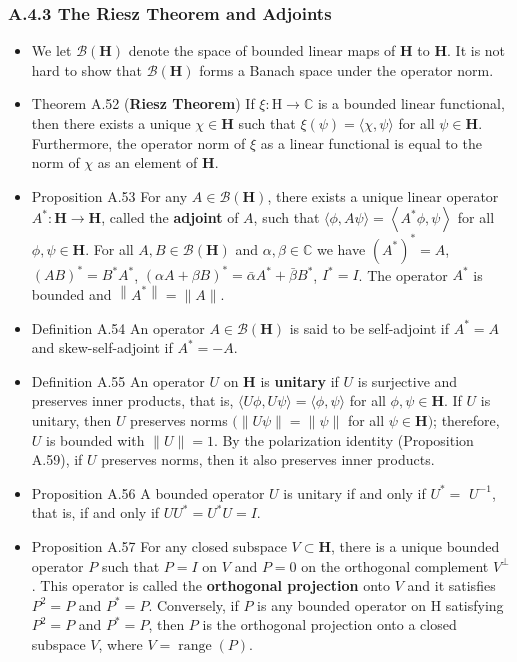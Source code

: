 \subsubsection{A.4.3 The Riesz Theorem and Adjoints}

\begin{itemize}
\item We let $\mathcal{B}(\mathbf{H})$ denote the space of bounded linear maps of $\mathbf{H}$ to $\mathbf{H}$. It is not hard to show that $\mathcal{B}(\mathbf{H})$ forms a Banach space under the operator norm.

\item Theorem A.52 (\textbf{Riesz Theorem}) If $\xi: \mathrm{H} \rightarrow \mathbb{C}$ is a bounded linear functional, then there exists a unique $\chi \in \mathbf{H}$ such that $\xi(\psi)=\langle\chi, \psi\rangle$ for all $\psi \in \mathbf{H}$. Furthermore, the operator norm of $\xi$ as a linear functional is equal to the norm of $\chi$ as an element of $\mathbf{H}$.

\item Proposition A.53 For any $A \in \mathcal{B}(\mathbf{H})$, there exists a unique linear operator $A^{*}: \mathbf{H} \rightarrow \mathbf{H}$, called the \textbf{adjoint} of $A$, such that $\langle\phi, A \psi\rangle=\left\langle A^{*} \phi, \psi\right\rangle$ for all $\phi, \psi \in \mathbf{H}$. For all $A, B \in \mathcal{B}(\mathbf{H})$ and $\alpha, \beta \in \mathbb{C}$ we have $\left(A^{*}\right)^{*} =A$, $(A B)^{*} =B^{*} A^{*}$, $(\alpha A+\beta B)^{*} =\bar{\alpha} A^{*}+\bar{\beta} B^{*}$, $I^{*} =I$. The operator $A^{*}$ is bounded and $\left\|A^{*}\right\|=\|A\|$.

\item Definition A.54 An operator $A \in \mathcal{B}(\mathbf{H})$ is said to be self-adjoint if $A^{*}=A$ and skew-self-adjoint if $A^{*}=-A$.

\item Definition A.55 An operator $U$ on $\mathbf{H}$ is \textbf{unitary} if $U$ is surjective and preserves inner products, that is, $\langle U \phi, U \psi\rangle=\langle\phi, \psi\rangle$ for all $\phi, \psi \in \mathbf{H}$.
If $U$ is unitary, then $U$ preserves norms $(\|U \psi\|=\|\psi\|$ for all $\psi \in \mathbf{H})$; therefore, $U$ is bounded with $\|U\|=1$. By the polarization identity (Proposition A.59), if $U$ preserves norms, then it also preserves inner products.

\item Proposition A.56 A bounded operator $U$ is unitary if and only if $U^{*}=$ $U^{-1}$, that is, if and only if $U U^{*}=U^{*} U=I$.

\item Proposition A.57 For any closed subspace $V \subset \mathbf{H}$, there is a unique bounded operator $P$ such that $P=I$ on $V$ and $P=0$ on the orthogonal complement $V^{\perp}$. This operator is called the \textbf{orthogonal projection} onto $V$ and it satisfies $P^{2}=P$ and $P^{*}=P$. Conversely, if $P$ is any bounded operator on $\mathrm{H}$ satisfying $P^{2}=P$ and $P^{*}=P$, then $P$ is the orthogonal projection onto a closed subspace $V$, where $V=\operatorname{range}(P)$.
\end{itemize}


